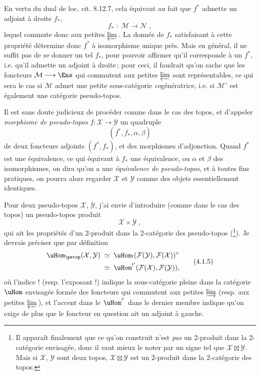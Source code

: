 En vertu du dual de loc. cit. 8.12.7, cela équivaut au fait que $f^*$ admette un adjoint à droite $f_*$,
\[
f_* \;:\; \mathcal{M} \longrightarrow \mathcal{N}\;,
\tag*{(4.1.2)}
\]
lequel commute donc aux petites $\varprojlim$\,. La donnée de $f_*$ satisfaisant à cette propriété détermine donc $f^*$ à isomorphisme unique près. Mais en général, il ne suffit pas de se donner un tel $f_*$, pour pouvoir affirmer qu'il corresponde à un $f^*$, i.e. qu'il admette un adjoint à droite\,; pour ceci, il faudrait qu'on sache que les foncteurs $\mathcal{M}\longrightarrow\Ens$ qui commutent aux petites $\varprojlim$ sont représentables, ce qui sera le cas si $\mathcal{M}$ admet une petite sous-catégorie \textit{co}génératrice, i.e. si $\mathcal{M}^\circ$ est également une catégorie pseudo-topos. %

\newpage


Il est sans doute judicieux de procéder comme dans le cas des topos, et d'appeler \textit{morphisme de pseudo-topos} $f:\mathcal{X}\longrightarrow\mathcal{Y}$ un quadruple
\[
(f^*,f_*,\alpha,\beta)
\tag*{(4.1.3)}
\]
de deux foncteurs adjoints $(f^*,f_*)$, et des morphismes d'adjonction. Quand $f^*$ est une équivalence, ce qui équivaut à $f_*$ une équivalence, ou $\alpha$ et $\beta$ des isomorphismes, on dira qu'on a une \textit{équivalence de pseudo-topos}, et à toutes fins pratiques, on pourra alors regarder $\mathcal{X}$ et $\mathcal{Y}$ comme des objets essentiellement identiques.

Pour deux pseudo-topos $\mathcal{X}$, $\mathcal{Y}$, j'ai envie d'introduire (comme dans le cas des topos) un pseudo-topos produit
\[
\mathcal{X}\times\mathcal{Y}\;,
\tag*{(4.1.4)}
\]
qui ait les propriétés d'un 2-produit dans la 2-catégorie des pseudo-topos (\footnote{Il apparaît finalement que ce qu'on construit n'est \textit{pas} un 2-produit dans la 2-catégorie envisagée, donc il vaut mieux le noter par un signe tel que $\mathcal{X}\boxtimes\mathcal{Y}$. Mais si $\mathcal{X}$, $\mathcal{Y}$ sont deux topos, $\mathcal{X}\boxtimes\mathcal{Y}$ est un 2-produit dans la 2-catégorie des topos.}). Je devrais préciser que par définition
\[
\begin{aligned}
\uHom_{\pstop}(\mathcal{X},\mathcal{Y}) \;&\simeq\; \uHom_!(\mathcal{F}(\mathcal{Y}),\mathcal{F}(\mathcal{X}))^\circ\\
&\simeq\; \uHom^{!'}(\mathcal{F}(\mathcal{X}),\mathcal{F}(\mathcal{Y})),
\end{aligned}
\tag*{(4.1.5)}
\]
où l'indice ! (resp. l'exposant !) indique la sous-catégorie pleine dans la catégorie $\uHom$ envisagée formée des foncteurs qui commutent aux petites $\varinjlim$ (resp. aux petites
$\varprojlim$\,), et l'accent dans le $\uHom^{!'}$ dans le dernier membre indique qu'on exige de plus que le foncteur en question ait un adjoint à gauche.

